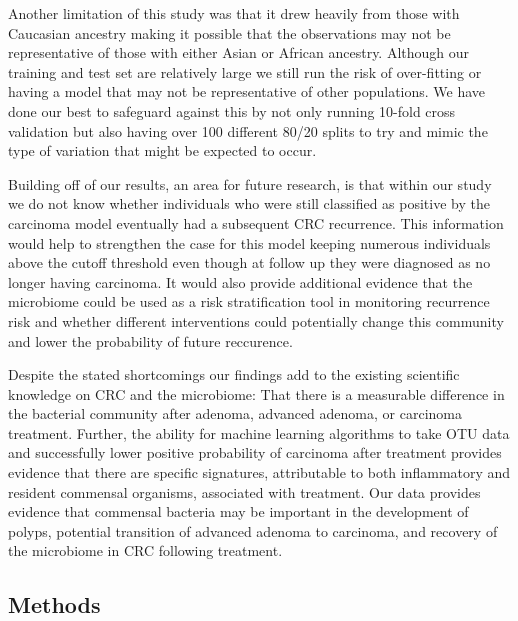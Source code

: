 \documentclass[12pt,]{article}
\begin{document}
Another limitation of this study was that it drew heavily from those
with Caucasian ancestry making it possible that the observations may not
be representative of those with either Asian or African ancestry.
Although our training and test set are relatively large we still run the
risk of over-fitting or having a model that may not be representative of
other populations. We have done our best to safeguard against this by
not only running 10-fold cross validation but also having over 100
different 80/20 splits to try and mimic the type of variation that might
be expected to occur.

Building off of our results, an area for future research, is that within
our study we do not know whether individuals who were still classified
as positive by the carcinoma model eventually had a subsequent CRC
recurrence. This information would help to strengthen the case for this
model keeping numerous individuals above the cutoff threshold even
though at follow up they were diagnosed as no longer having carcinoma.
It would also provide additional evidence that the microbiome could be
used as a risk stratification tool in monitoring recurrence risk and
whether different interventions could potentially change this community
and lower the probability of future reccurence.

Despite the stated shortcomings our findings add to the existing
scientific knowledge on CRC and the microbiome: That there is a
measurable difference in the bacterial community after adenoma, advanced
adenoma, or carcinoma treatment. Further, the ability for machine
learning algorithms to take OTU data and successfully lower positive
probability of carcinoma after treatment provides evidence that there
are specific signatures, attributable to both inflammatory and resident
commensal organisms, associated with treatment. Our data provides
evidence that commensal bacteria may be important in the development of
polyps, potential transition of advanced adenoma to carcinoma, and
recovery of the microbiome in CRC following treatment.

\newpage

\subsection{Methods}\label{methods}
\end{document}
